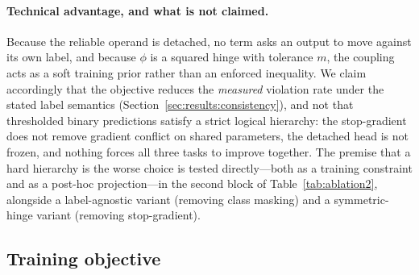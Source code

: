 \documentclass[webpdf,modern,large,namedate]{oup-authoring-template}
\theoremstyle{thmstyleone}
\theoremstyle{thmstyletwo}
\theoremstyle{thmstylethree}
\begin{document}
\paragraph{Technical advantage, and what is not claimed.}
Because the reliable operand is detached, no term asks an output to move
against its own label, and because $\phi$ is a squared hinge with tolerance
$m$, the coupling acts as a soft training prior rather than an enforced
inequality. We claim accordingly that the objective reduces the \emph{measured}
violation rate under the stated label semantics
(Section~\ref{sec:results:consistency}), and not that thresholded binary
predictions satisfy a strict logical hierarchy: the stop-gradient does not
remove gradient conflict on shared parameters, the detached head is not frozen,
and nothing forces all three tasks to improve together. The premise that a hard
hierarchy is the worse choice is tested directly---both as a training
constraint and as a post-hoc projection---in the second block of
Table~\ref{tab:ablation2}, alongside a label-agnostic variant (removing class
masking) and a symmetric-hinge variant (removing stop-gradient).

\subsection{Training objective}\label{sec:method:loss}
\end{document}
